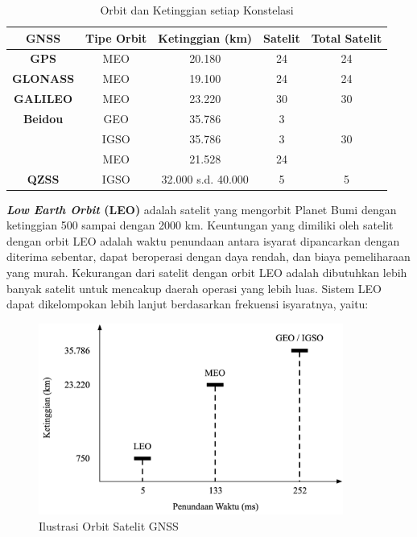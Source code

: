 \begin{table}[H]
	\caption{Orbit dan Ketinggian setiap Konstelasi \cite{Li2019} \cite{Bury2019}}
	\vspace{0.5em}
	\centering
	\begin{tabular}{ccccc}
		\hline
		\textbf{GNSS} &\textbf{Tipe Orbit} & \textbf{Ketinggian (km)} & \textbf{Satelit} & \textbf{Total Satelit}\\
		\hline 
		\textbf{GPS} & MEO & 20.180 & 24 & 24\\
		\textbf{GLONASS} & MEO & 19.100 & 24 & 24\\
		\textbf{GALILEO} & MEO & 23.220 & 30 & 30\\
		\textbf{Beidou} & GEO & 35.786 & 3\\
		& IGSO & 35.786 & 3 & 30\\
		& MEO& 21.528 & 24\\
		\textbf{QZSS} & IGSO &32.000 s.d. 40.000 & 5 & 5\\
		\hline
	\end{tabular}
	\label{Tab: gnss-orbit}
\end{table}

\textbf{\textit{Low Earth Orbit} (LEO)} adalah satelit yang mengorbit Planet Bumi dengan ketinggian 500 sampai dengan 2000 km. Keuntungan yang dimiliki oleh satelit dengan orbit LEO adalah waktu penundaan antara isyarat dipancarkan dengan diterima sebentar, dapat beroperasi dengan daya rendah, dan biaya pemeliharaan yang murah. Kekurangan dari satelit dengan orbit LEO adalah dibutuhkan lebih banyak satelit untuk mencakup daerah operasi yang lebih luas. Sistem LEO dapat dikelompokan lebih lanjut berdasarkan frekuensi isyaratnya, yaitu:

\begin{figure}[H]
	\centering
	\includegraphics[width=10cm]{contents/chapter-2/alt-comp.png}
	\caption{Ilustrasi Orbit Satelit GNSS}
	\label{Fig: alt-comp}
\end{figure}


